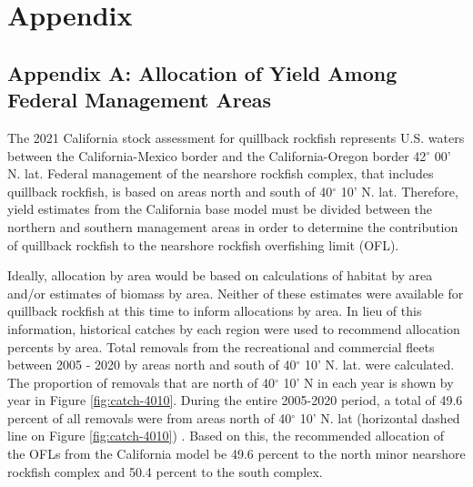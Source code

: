 \documentclass[11pt,
  english,
  letterpaper,
]{article}
\begin{document}

\hypertarget{appendix}{%
\section{Appendix}\label{appendix}}

\leavevmode\tagmcend\tagstructend


\hypertarget{append_a}{%
\subsection{Appendix A: Allocation of Yield Among Federal Management Areas}\label{append_a}}

\leavevmode\tagmcend\tagstructend


The 2021 California stock assessment for quillback rockfish represents U.S. waters between the California-Mexico border and the California-Oregon border 42{\(^\circ\)\leavevmode\tagmcend\tagstructend} 00' N. lat. Federal management of the nearshore rockfish complex, that includes quillback rockfish, is based on areas north and south of 40{\(^\circ\)\leavevmode\tagmcend\tagstructend} 10' N. lat. Therefore, yield estimates from the California base model must be divided between the northern and southern management areas in order to determine the contribution of quillback rockfish to the nearshore rockfish overfishing limit (OFL).

\leavevmode\tagmcend\tagstructend\par


Ideally, allocation by area would be based on calculations of habitat by area and/or estimates of biomass by area. Neither of these estimates were available for quillback rockfish at this time to inform allocations by area. In lieu of this information, historical catches by each region were used to recommend allocation percents by area. Total removals from the recreational and commercial fleets between 2005 - 2020 by areas north and south of 40{\(^\circ\)\leavevmode\tagmcend\tagstructend} 10' N. lat. were calculated. The proportion of removals that are north of 40{\(^\circ\)\leavevmode\tagmcend\tagstructend} 10' N in each year is shown by year in Figure \ref{fig:catch-4010}. During the entire 2005-2020 period, a total of 49.6 percent of all removals were from areas north of 40{\(^\circ\)\leavevmode\tagmcend\tagstructend} 10' N. lat (horizontal dashed line on Figure \ref{fig:catch-4010}) . Based on this, the recommended allocation of the OFLs from the California model be 49.6 percent to the north minor nearshore rockfish complex and 50.4 percent to the south complex.
\end{document}
